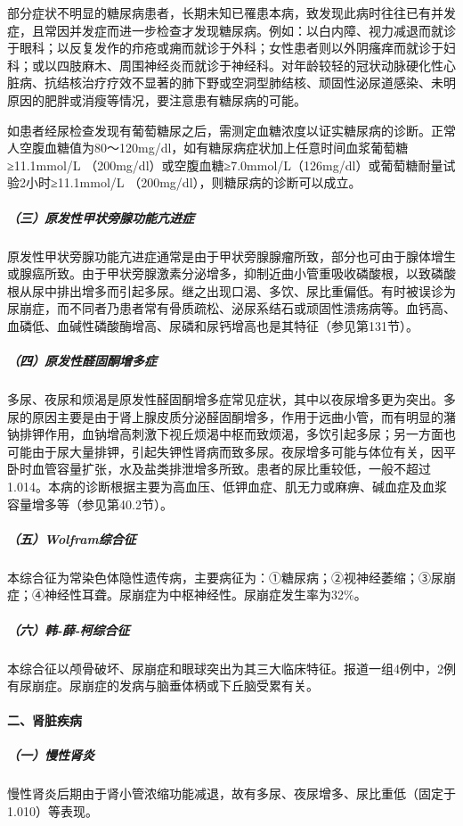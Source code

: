 部分症状不明显的糖尿病患者，长期未知已罹患本病，致发现此病时往往已有并发症，且常因并发症而进一步检查才发现糖尿病。例如：以白内障、视力减退而就诊于眼科；以反复发作的疖疮或痈而就诊于外科；女性患者则以外阴瘙痒而就诊于妇科；或以四肢麻木、周围神经炎而就诊于神经科。对年龄较轻的冠状动脉硬化性心脏病、抗结核治疗疗效不显著的肺下野或空洞型肺结核、顽固性泌尿道感染、未明原因的肥胖或消瘦等情况，要注意患有糖尿病的可能。

如患者经尿检查发现有葡萄糖尿之后，需测定血糖浓度以证实糖尿病的诊断。正常人空腹血糖值为80～120mg/dl，如有糖尿病症状加上任意时间血浆葡萄糖≥11.1mmol/L
（200mg/dl）或空腹血糖≥7.0mmol/L（126mg/dl）或葡萄糖耐量试验2小时≥11.1mmol/L
（200mg/dl），则糖尿病的诊断可以成立。

\subparagraph{（三）原发性甲状旁腺功能亢进症}

原发性甲状旁腺功能亢进症通常是由于甲状旁腺腺瘤所致，部分也可由于腺体增生或腺癌所致。由于甲状旁腺激素分泌增多，抑制近曲小管重吸收磷酸根，以致磷酸根从尿中排出增多而引起多尿。继之出现口渴、多饮、尿比重偏低。有时被误诊为尿崩症，而不同者乃患者常有骨质疏松、泌尿系结石或顽固性溃疡病等。血钙高、血磷低、血碱性磷酸酶增高、尿磷和尿钙增高也是其特征（参见第131节）。

\subparagraph{（四）原发性醛固酮增多症}

多尿、夜尿和烦渴是原发性醛固酮增多症常见症状，其中以夜尿增多更为突出。多尿的原因主要是由于肾上腺皮质分泌醛固酮增多，作用于远曲小管，而有明显的潴钠排钾作用，血钠增高刺激下视丘烦渴中枢而致烦渴，多饮引起多尿；另一方面也可能由于尿大量排钾，引起失钾性肾病而致多尿。夜尿增多可能与体位有关，因平卧时血管容量扩张，水及盐类排泄增多所致。患者的尿比重较低，一般不超过1.014。本病的诊断根据主要为高血压、低钾血症、肌无力或麻痹、碱血症及血浆容量增多等（参见第40.2节）。

\subparagraph{（五）Wolfram综合征}

本综合征为常染色体隐性遗传病，主要病征为：①糖尿病；②视神经萎缩；③尿崩症；④神经性耳聋。尿崩症为中枢神经性。尿崩症发生率为32\%。

\subparagraph{（六）韩-薛-柯综合征}

本综合征以颅骨破坏、尿崩症和眼球突出为其三大临床特征。报道一组4例中，2例有尿崩症。尿崩症的发病与脑垂体柄或下丘脑受累有关。

\paragraph{二、肾脏疾病}

\subparagraph{（一）慢性肾炎}

慢性肾炎后期由于肾小管浓缩功能减退，故有多尿、夜尿增多、尿比重低（固定于1.010）等表现。


